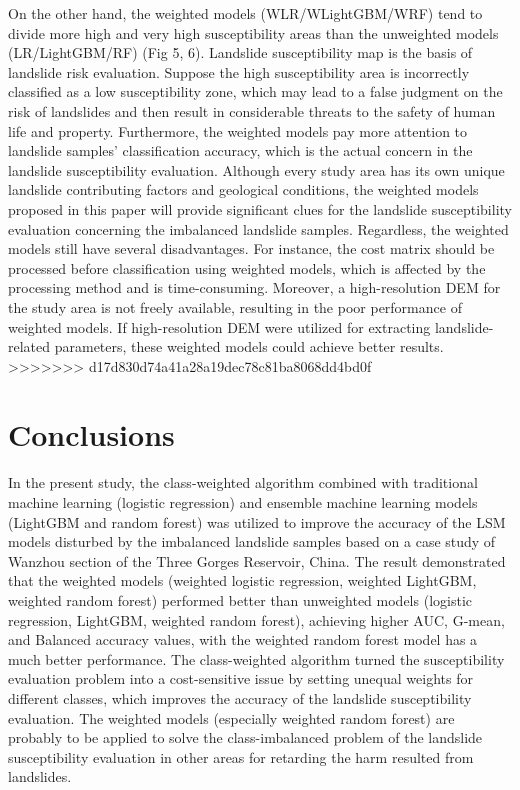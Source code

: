 \documentclass[a4paper,fleqn]{cas-sc}
\begin{document}
On the other hand, the weighted models (WLR/WLightGBM/WRF) tend to divide more high and very high susceptibility areas than the unweighted models (LR/LightGBM/RF) (Fig 5, 6). Landslide susceptibility map is the basis of landslide risk evaluation. Suppose the high susceptibility area is incorrectly classified as a low susceptibility zone, which may lead to a false judgment on the risk of landslides and then result in considerable threats to the safety of human life and property. Furthermore, the weighted models pay more attention to landslide samples' classification accuracy, which is the actual concern in the landslide susceptibility evaluation. Although every study area has its own unique landslide contributing factors and geological conditions, the weighted models proposed in this paper will provide significant clues for the landslide susceptibility evaluation concerning the imbalanced landslide samples. Regardless, the weighted models still have several disadvantages. 
For instance, the cost matrix should be processed before classiﬁcation using weighted models, which is affected by the processing method and is time-consuming. Moreover, a high-resolution DEM for the study area is not freely available, resulting in the poor performance of weighted models. If high-resolution DEM were utilized for extracting landslide-related parameters, these weighted models could achieve better results. 
>>>>>>> d17d830d74a41a28a19dec78c81ba8068dd4bd0f

\section{Conclusions}

In the present study, the class-weighted algorithm combined with traditional machine learning (logistic regression) and ensemble machine learning models (LightGBM and random forest) was utilized to improve the accuracy of the LSM models disturbed by the imbalanced landslide samples based on a case study of Wanzhou section of the Three Gorges Reservoir, China. The result demonstrated that the weighted models (weighted logistic regression, weighted LightGBM, weighted random forest) performed better than unweighted models (logistic regression, LightGBM, weighted random forest), achieving higher AUC, G-mean, and Balanced accuracy values, with the weighted random forest model has a much better performance. The class-weighted algorithm turned the susceptibility evaluation problem into a cost-sensitive issue by setting unequal weights for different classes, which improves the accuracy of the landslide susceptibility evaluation. The weighted models (especially weighted random forest) are probably to be applied to solve the class-imbalanced problem of the landslide susceptibility evaluation in other areas for retarding the harm resulted from landslides. 
\end{document}
